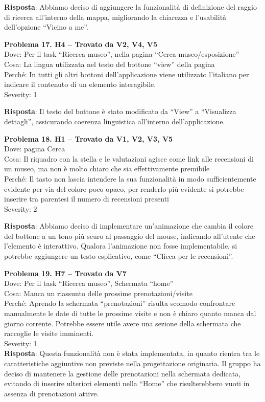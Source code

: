 \documentclass{article}
\begin{document}
\noindent \textbf{Risposta}: Abbiamo deciso di aggiungere la funzionalità di definizione del raggio di ricerca all'interno della mappa, migliorando la chiarezza e l'usabilità dell’opzione “Vicino a me”.

\noindent \textbf{Problema 17. H4 – Trovato da V2, V4, V5} \\
Dove: Per il task “Ricerca museo”, nella pagina “Cerca museo/esposizione” \\
Cosa: La lingua utilizzata nel testo del bottone “view” della pagina \\
Perché: In tutti gli altri bottoni dell’applicazione viene utilizzato l’italiano per indicare il contenuto di un elemento interagibile. \\
Severity: 1 

\noindent \textbf{Risposta}: Il testo del bottone è stato modificato da “View” a “Visualizza dettagli”, assicurando coerenza linguistica all’interno dell’applicazione.

\noindent \textbf{Problema 18. H1 – Trovato da V1, V2, V3, V5} \\
Dove: pagina Cerca \\
Cosa: Il riquadro con la stella e le valutazioni agisce come link alle recensioni di un museo, ma non è molto chiaro che sia effettivamente premibile \\
Perché: Il tasto non lascia intendere la sua funzionalità in modo sufficientemente evidente per via del colore poco opaco, per renderlo più evidente si potrebbe inserire tra parentesi il numero di recensioni presenti \\
Severity: 2

\noindent \textbf{Risposta}: Abbiamo deciso di implementare un'animazione che cambia il colore del bottone a un tono più scuro al passaggio del mouse, indicando all’utente che l’elemento è interattivo. Qualora l’animazione non fosse implementabile, si potrebbe aggiungere un testo esplicativo, come “Clicca per le recensioni”.

\noindent \textbf{Problema 19. H7 – Trovato da V7} \\
Dove: Per il task “Ricerca museo”, Schermata “home” \\
Cosa: Manca un riassunto delle prossime prenotazioni/visite \\
Perché: Aprendo la schermata “prenotazioni” risulta scomodo confrontare manualmente le date di tutte le prossime visite e non è chiaro quanto manca dal giorno corrente. Potrebbe essere utile avere una sezione della schermata che raccoglie le visite imminenti. \\
Severity: 1 \\
\textbf{Risposta}: Questa funzionalità non è stata implementata, in quanto rientra tra le caratteristiche aggiuntive non previste nella progettazione originaria. Il gruppo ha deciso di mantenere la gestione delle prenotazioni nella schermata dedicata, evitando di inserire ulteriori elementi nella “Home” che risulterebbero vuoti in assenza di prenotazioni attive.
\end{document}
